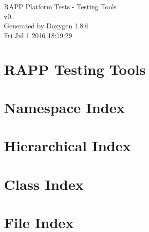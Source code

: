 \documentclass[twoside]{book}
\newcommand{\clearemptydoublepage}{%
  \newpage{\pagestyle{empty}\cleardoublepage}%
}
\begin{document}
\hypersetup{pageanchor=false}
\begin{titlepage}
\vspace*{7cm}
\begin{center}%
{\Large R\-A\-P\-P Platform Tests -\/ Testing Tools \\[1ex]\large v0.. }\\
\vspace*{1cm}
{\large Generated by Doxygen 1.8.6}\\
\vspace*{0.5cm}
{\small Fri Jul 1 2016 18:19:29}\\
\end{center}
\end{titlepage}
\clearemptydoublepage
\tableofcontents
\clearemptydoublepage
{}
\hypersetup{pageanchor=true}

\chapter{R\-A\-P\-P Testing Tools}
\label{md__home_travis_rapp_temp_rapp-platform_rapp_testing_tools_README}
\hypertarget{md__home_travis_rapp_temp_rapp-platform_rapp_testing_tools_README}{}

\chapter{Namespace Index}

\chapter{Hierarchical Index}

\chapter{Class Index}

\chapter{File Index}

\end{document}
